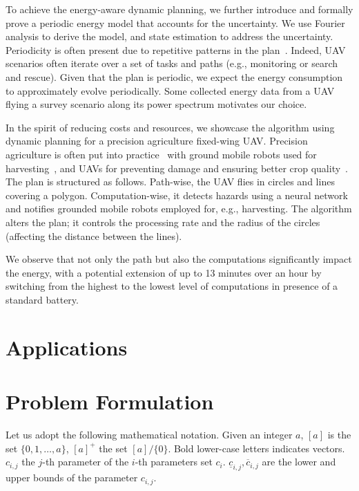 To achieve the energy-aware dynamic planning, we further introduce and formally prove a periodic energy model that accounts for the uncertainty. We use Fourier analysis to derive the model, and state estimation to address the uncertainty. Periodicity is often present due to repetitive patterns in the plan~\citep{seewald2020mechanical}. Indeed, UAV scenarios often iterate over a set of tasks and paths (e.g., monitoring or search and rescue). Given that the plan is periodic, we expect the energy consumption to approximately evolve periodically. Some collected energy data from a UAV flying a survey scenario along its power spectrum motivates our choice.


In the spirit of reducing costs and resources, we showcase the algorithm using dynamic planning for a precision agriculture fixed-wing UAV. Precision agriculture is often put into practice~\citep{hajjaj2014review} with ground mobile robots used for harvesting~\citep{qingchun2012study,dong2011development, de2011design, aljanobi2010setup, li2008analysis, edan2000robotic}, and UAVs for preventing damage and ensuring better crop quality~\citep{puri2017agriculture, daponte2019review}. The plan is structured as follows. Path-wise, the UAV flies in circles and lines covering a polygon. Computation-wise, it detects hazards using a neural network and notifies grounded mobile robots employed for, e.g., harvesting. The algorithm alters the plan; it controls the processing rate and the radius of the circles (affecting the distance between the lines). 

We observe that not only the path but also the computations significantly impact the energy, with a potential extension of up to 13 minutes over an hour by switching from the highest to the lowest level of computations in presence of a standard battery.

\section{Applications}

\section{Problem Formulation}
\label{cp:intro:pb}

Let us adopt the following mathematical notation. Given an integer $a$, $[a]$ is the set $\{0,1,\dots,a\}$, $[a]^+$ the set $[a]/\{0\}$. Bold lower-case letters indicates vectors. $c_{i,j}$ the $j$-th parameter of the $i$-th parameters set $c_i$. $\underline{c}_{i,j},\overline{c}_{i,j}$ are the lower and upper bounds of the parameter $c_{i,j}$.

